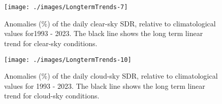 
%
%
%
%



\appendixstart
\appendix
\section[\appendixname~\thesection]{}




\begin{figure}[h!]
    {\centering
        \texttt{[image: ./images/LongtermTrends-7]}

    }
    \caption{Anomalies (\%) of the daily clear-sky SDR, relative to climatological values for1993 - 2023. The black line shows the long term linear trend for clear-sky conditions.}\label{fig:trendCLEAR}
\end{figure}



\begin{figure}[h!]
    {\centering
        \texttt{[image: ./images/LongtermTrends-10]}

    }
    \caption{Anomalies (\%) of the daily cloud-sky SDR, relative to climatological values for 1993 - 2023. The black line shows the long term linear trend for cloud-sky conditions.}\label{fig:trendCLOUD}
\end{figure}



